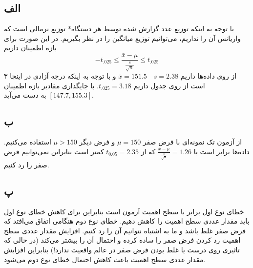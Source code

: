 \subsection*{الف}

با توجه به اینکه توزیع عدد گزارش شده توسط هر دستگاه* توزیع نرمالی است که واریانس آن را نداریم، می‌توانیم توزیع میانگین را
در نظر بگیریم. در این صورت برای بازه اطمینان داریم
$$-t_{.025} \leq \frac{\bar{x} - \mu}{\frac{s}{\sqrt{n}}} \leq t_{.025}$$
از روی داده‌ها داریم
$\bar{x} = 151.5 \quad s = 2.38$
و با توجه به اینکه درجه آزادی در اینجا ۳ است از روی جدول
داریم
$t_{.025} = 3.18$.
با جایگذاری مقادیر بازه اطمینان
$[147.7, 155.3]$
به دست می‌آید.

\subsection*{ب}
از آزمون تک نمونه‌ای
با فرض صفر
$\mu = 150$
و فرض دیگر
$\mu > 150$
استفاده می‌کنیم. 
داده‌ها برابر است با
$\frac{\bar{x} - \mu}{\frac{s}{\sqrt{n}}} = 1.26$
که از
$t_{0.05} = 2.35$
کمتر است بنابراین نمی‌توانیم فرض صفر را رد کنیم.

\subsection*{پ}
خطای نوع اول برابر با سطح اهمیت آزمون است بنابراین برای کاهش خطای نوع اول باید مقدار عددی سطح اهمیت را کاهش دهیم. خطای نوع دوم هنگامی اتفاق می‌افتد که فرض صفر غلط باشد و ما به اشتباه نتوانیم آن را رد کنیم. افزایش مقدار عددی سطح اهمیت رد کردن فرض صفر را ساده کرده و احتمال آن را بیشتر می‌کند (در حالی که تاثیری روی درست یا غلط بودن فرض صفر در عالم واقعیت ندارد!) بنابراین افزایش مقدار عددی سطح اهمیت باعث کاهش احتمال خطای نوع دوم می‌شود.